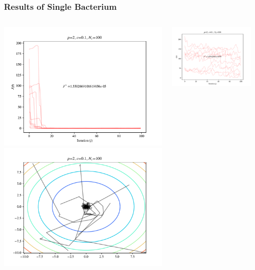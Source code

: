 \documentclass{beamer}
\begin{document}
\begin{frame}
\frametitle{Results of Single Bacterium}
\begin{columns}
\begin{center}
\includegraphics[scale=0.3]{assets/sphere_J}
\includegraphics[scale=0.3]{assets/sphere_theta}
\end{center}
\includegraphics[scale=0.3]{assets/rastrigin_J}

\end{columns}
\end{frame}
\end{document}
